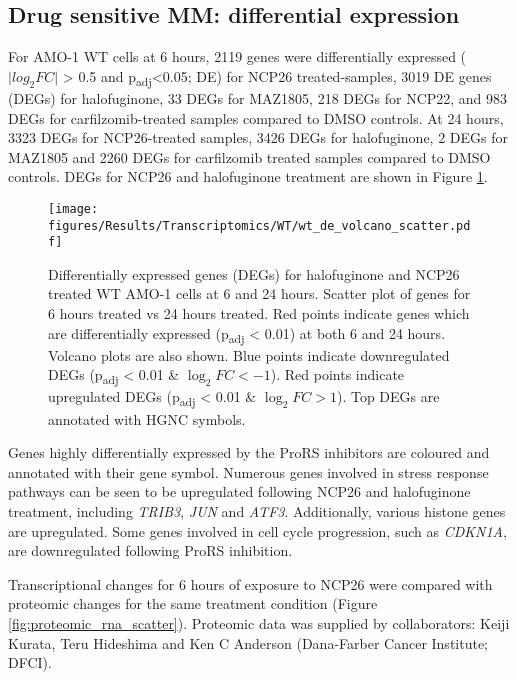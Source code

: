 \subsection{Drug sensitive MM: differential expression}
For AMO-1 WT cells at 6 hours, 2119 genes were differentially expressed ($\lvert log_{2}FC \rvert$ > 0.5 and p\textsubscript{adj}<0.05; DE) for NCP26 treated-samples, 3019 DE genes (DEGs) for halofuginone, 33 DEGs for MAZ1805, 218 DEGs for NCP22, and 983 DEGs for carfilzomib-treated samples compared to DMSO controls.
At 24 hours, 3323 DEGs for NCP26-treated samples, 3426 DEGs for halofuginone, 2 DEGs for MAZ1805 and 2260 DEGs for carfilzomib treated samples compared to DMSO controls.
DEGs for NCP26 and halofuginone treatment are shown in Figure \ref{fig:wt_de}.
%
\begin{figure}[htb]
\centering
\texttt{[image: figures/Results/Transcriptomics/WT/wt\_de\_volcano\_scatter.pdf]}
\caption[Differentially expressed genes WT AMO-1 cells]{Differentially expressed genes (DEGs) for halofuginone and NCP26 treated WT AMO-1 cells at 6 and 24 hours.
Scatter plot of genes for 6 hours treated vs 24 hours treated.
Red points indicate genes which are differentially expressed (p\textsubscript{adj} < 0.01) at both 6 and 24 hours.
Volcano plots are also shown.
Blue points indicate downregulated DEGs (p\textsubscript{adj} < 0.01 \& $\log_{2}FC < -1$).
Red points indicate upregulated DEGs (p\textsubscript{adj} < 0.01 \& $\log_{2}FC > 1$).
Top DEGs are annotated with HGNC symbols.
}
\label{fig:wt_de}
\end{figure}
Genes highly differentially expressed by the ProRS inhibitors are coloured and annotated with their gene symbol.
Numerous genes involved in stress response pathways can be seen to be upregulated following NCP26 and halofuginone treatment, including \textit{TRIB3}, \textit{JUN} and \textit{ATF3}.
Additionally, various histone genes are upregulated.
Some genes involved in cell cycle progression, such as \textit{CDKN1A}, are downregulated following ProRS inhibition.

Transcriptional changes for 6 hours of exposure to NCP26 were compared with proteomic changes for the same treatment condition (Figure \ref{fig:proteomic_rna_scatter}).
Proteomic data was supplied by collaborators: Keiji Kurata, Teru Hideshima and Ken C Anderson (Dana-Farber Cancer Institute; DFCI).

